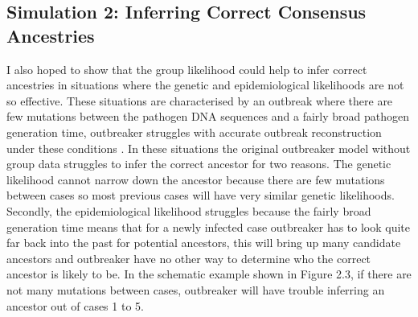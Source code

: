 \documentclass[11pt,a4paper]{report}
\begin{document}
\subsection{Simulation 2: Inferring Correct Consensus Ancestries}
I also hoped to show that the group likelihood could help to infer correct ancestries in situations where the genetic and epidemiological likelihoods are not so effective. These situations are characterised by an outbreak where there are few mutations between the pathogen DNA sequences and a fairly broad pathogen generation time, outbreaker struggles with accurate outbreak reconstruction under these conditions \citep{outbrkr}.  In these situations the original outbreaker model without group data struggles to infer the correct ancestor for two reasons. The genetic likelihood cannot narrow down the ancestor because there are few mutations between cases so most previous cases will have very similar genetic likelihoods. Secondly, the epidemiological likelihood struggles because the fairly broad generation time means that for a newly infected case outbreaker has to look quite far back into the past for potential ancestors, this will bring up many candidate ancestors and outbreaker have no other way to determine who the correct ancestor is likely to be. In the schematic example shown in Figure 2.3, if there are not many mutations between cases, outbreaker will have trouble inferring an ancestor out of cases 1 to 5.
\\
\end{document}
